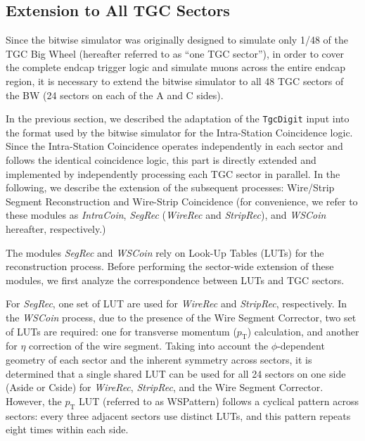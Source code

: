 \subsection{Extension to All TGC Sectors} \label{subsec:Extension}
Since the bitwise simulator was originally designed to simulate only 1/48 of the TGC Big Wheel (hereafter referred to as ``one TGC sector''), in order to cover the complete endcap trigger logic and simulate muons across the entire endcap region, it is necessary to extend the bitwise simulator to all 48 TGC sectors of the BW (24 sectors on each of the A and C sides).

In the previous section, we described the adaptation of the \texttt{TgcDigit} input into the format used by the bitwise simulator for the Intra-Station Coincidence logic. Since the Intra-Station Coincidence operates independently in each sector and follows the identical coincidence logic, this part is directly extended and implemented by independently processing each TGC sector in parallel. In the following, we describe the extension of the subsequent processes: Wire/Strip Segment Reconstruction and Wire-Strip Coincidence (for convenience, we refer to these modules as \textit{IntraCoin}, \textit{SegRec} (\textit{WireRec} and \textit{StripRec}), and \textit{WSCoin} hereafter, respectively.)

The modules \textit{SegRec} and \textit{WSCoin} rely on Look-Up Tables (LUTs) for the reconstruction process. Before performing the sector-wide extension of these modules, we first analyze the correspondence between LUTs and TGC sectors.

For \textit{SegRec}, one set of LUT are used for \textit{WireRec} and \textit{StripRec}, respectively. In the \textit{WSCoin} process, due to the presence of the Wire Segment Corrector, two set of LUTs are required: one for transverse momentum ($p_\mathrm{T}$) calculation, and another for $\eta$ correction of the wire segment. Taking into account the $\phi$-dependent geometry of each sector and the inherent symmetry across sectors, it is determined that a single shared LUT can be used for all 24 sectors on one side (Aside or Cside) for \textit{WireRec}, \textit{StripRec}, and the Wire Segment Corrector. However, the $p_\mathrm{T}$ LUT (referred to as WSPattern) follows a cyclical pattern across sectors: every three adjacent sectors use distinct LUTs, and this pattern repeats eight times within each side.

